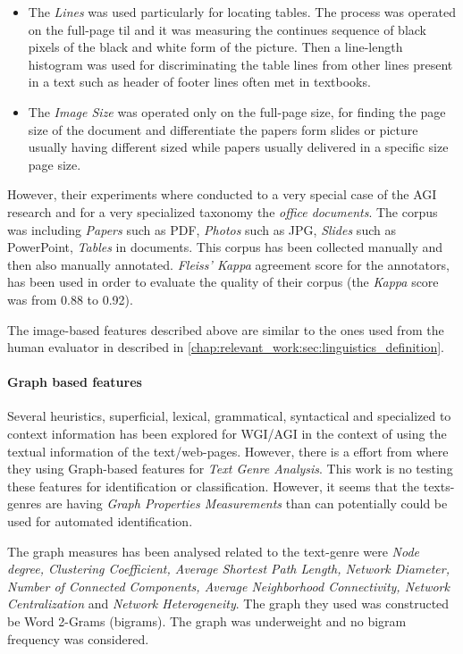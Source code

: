 \begin{itemize}
\item The \textit{Lines} was used particularly for locating tables. The process was operated on the full-page til and it was measuring the continues sequence of black pixels of the black and white form of the picture. Then a line-length histogram was used for discriminating the table lines from other lines present in a text such as header of footer lines often met in textbooks.
\item The \textit{Image Size} was operated only on the full-page size, for finding the page size of the document and differentiate the papers form slides or picture usually having different sized while papers usually delivered in a specific size page size.
\end{itemize}

However, their experiments where conducted to a very special case of  the AGI research and for a very specialized taxonomy the \textit{office documents}. The corpus was including \textit{Papers} such as PDF, \textit{Photos} such as JPG, \textit{Slides} such as PowerPoint, \textit{Tables} in documents. This corpus has been collected manually and then also manually annotated. \textit{Fleiss' Kappa} agreement score for the annotators, has been used in order to evaluate the quality of their corpus (the \textit{Kappa} score was from 0.88 to 0.92).

The image-based features described above are similar to the ones used from the human evaluator in \parencite{clark2014you} described in \ref{chap:relevant_work:sec:linguistics_definition}.

\paragraph{Graph based features} Several heuristics, superficial, lexical, grammatical, syntactical and specialized to context information has been explored for WGI/AGI in the context of using the textual information of the text/web-pages. However, there is a effort from \parencite{nabhan2016graph} where they using Graph-based features for \textit{Text Genre Analysis}. This work is no testing these features for identification or classification. However, it seems that the texts-genres are having \textit{Graph Properties Measurements} than can potentially could be used for automated identification.

The graph measures has been analysed related to the text-genre were \textit{Node degree, Clustering Coefficient, Average Shortest Path Length, Network Diameter, Number of Connected Components, Average Neighborhood Connectivity, Network Centralization} and \textit{Network Heterogeneity}. The graph they used was constructed be Word 2-Grams (bigrams). The graph was underweight and no bigram frequency was considered.  


